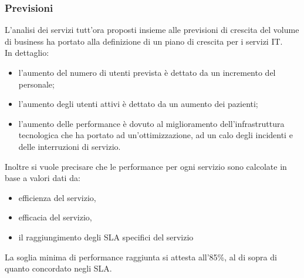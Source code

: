 	\subsubsection{Previsioni}
	L'analisi dei servizi tutt'ora proposti insieme alle previsioni di crescita del volume di business ha portato alla definizione di un piano di crescita per i servizi IT.\\
	In dettaglio:
	\begin{itemize}
		\item l'aumento del numero di utenti prevista è dettato da un incremento del personale;
		\item l'aumento degli utenti attivi è dettato da un aumento dei pazienti;
		\item l'aumento delle performance è dovuto al miglioramento dell'infrastruttura tecnologica che ha portato ad un'ottimizzazione, ad un calo degli incidenti e delle interruzioni di servizio.
	\end{itemize}

Inoltre si vuole precisare che le performance per ogni servizio sono calcolate in base a valori dati da:
\begin{itemize}
	\item efficienza del servizio,
	\item efficacia del servizio,
	\item il raggiungimento degli SLA specifici del servizio
\end{itemize}
La soglia minima di performance raggiunta si attesta all’85\%, al di sopra di quanto concordato negli SLA.
	
